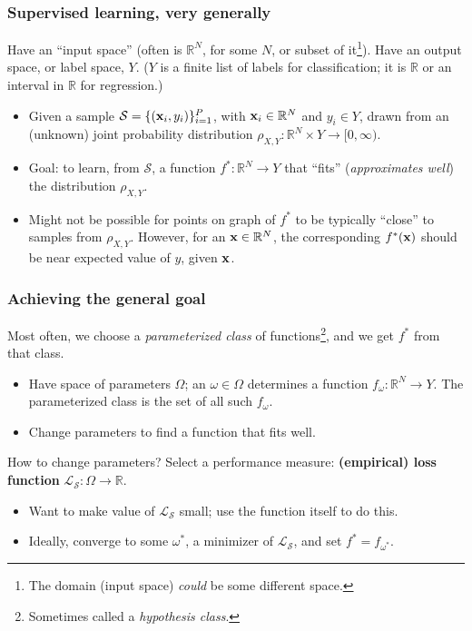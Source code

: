 \documentclass{beamer}
\theoremstyle{example}
\newcommand{\bb}[1]{\mathbb{#1}}
\begin{document}
\begin{frame}
\frametitle{Supervised learning, very generally}
Have an ``input space'' (often is $\mathbb R^{N}$, for some $N$, or subset of it\footnote{The domain (input space) \textit{could} be some different space.}).  Have an output space, or label space, $Y$. ($Y$ is a finite list of labels for classification; it is $\bb R$ or an interval in $\bb R$ for regression.) 

\pause
\begin{itemize}
    \item Given a sample $\mathcal S = \{({\bf x}_i, y_i)\}_{i=1}^P$, with ${\bf x}_i\in\mathbb R^N$ and $y_i\in Y$, drawn from an (unknown) joint probability distribution $\rho_{X,Y}:\mathbb R^{N}\times Y \to [0, \infty)$. 
    \pause
    \item Goal: to learn, from $\mathcal S$, a function $f^*:\mathbb R^N\to Y$ that ``fits'' (\textit{approximates well}) the distribution $\rho_{X,Y}$. 
    \pause
    \item Might not be possible for points on graph of $f^*$ to be typically ``close'' to samples from $\rho_{X,Y}$. However, for an ${\bf x}\in\mathbb R^N$, the corresponding $f^*(\bf x)$ should be near expected value of $y$, given ${\bf x}$.
\end{itemize}

\end{frame}

\begin{frame}
\frametitle{Achieving the general goal}
Most often, we choose a \textit{parameterized class} of functions\footnote{Sometimes called a \textit{hypothesis class}.}, and we get $f^*$ from that class. 
\pause
\begin{itemize}
    \item Have space of parameters $\Omega$; an $\omega\in\Omega$ determines a function $f_{\omega}:\mathbb R^N \to Y$. The parameterized class is the set of all such $f_\omega$. %
    \pause
    \item Change parameters to find a function that fits well.
\end{itemize}

\pause
How to change parameters?  Select a performance measure: \textbf{(empirical) loss function} $\mathcal L_{\mathcal S}:\Omega \to \mathbb R$. %
\begin{itemize}
    \pause
    \item Want to make value of $\mathcal L_{\mathcal S}$ small; use the function itself to do this.
    \pause
    \item Ideally, converge to some $\omega^*$, a minimizer of $\mathcal L_{\mathcal S}$, and set $f^* = f_{\omega^*}$.
\end{itemize}

\end{frame}
\end{document}

